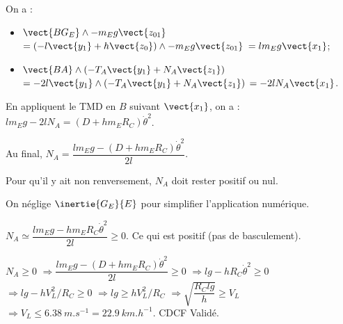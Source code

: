 \ifnormal
{}
\else
\fi
\ifprof
\begin{corrige}
On a : 
\begin{itemize}
\item $\vect{BG_E}\wedge - m_E g \vect{z_{01}}$ 
$=\left(-l\vect{y_1}+h\vect{z_0} \right) \wedge - m_E g \vect{z_{01}}$
$=l  m_E g \vect{x_{1}}$;
\item $\vect{BA}\wedge \left(-T_A\vect{y_1}+N_A\vect{z_1} \right)$ 
$=-2l\vect{y_1}\wedge \left(-T_A\vect{y_1}+N_A\vect{z_1} \right)$
$=-2l N_A\vect{x_1} $.
\end{itemize}
En appliquent le TMD en $B$ suivant $\vect{x_1}$, on a : $l  m_E g -2l N_A=\left(D+ h m_E R_C\right)\dot{\theta}^2$. 

Au final,  $ N_A=\dfrac{ l  m_E g-\left(D+ h m_E R_C\right)\dot{\theta}^2}{2l}$. 
\end{corrige}
\else
\fi

\ifnormal
{}
\else
\fi

\ifprof
\begin{corrige}
Pour qu'il y ait non renversement, $N_A$ doit rester positif ou nul. 
\end{corrige}
\else
\fi

\iftdifficile
{}

\else
\fi


On néglige $\inertie{G_E}{E}$ pour simplifier l’application numérique.

\ifprof
\begin{corrige}
$ N_A\simeq\dfrac{l  m_E g-h m_E R_C\dot{\theta}^2 }{2l} \geq 0$.%
Ce qui est positif (pas de basculement). 

$N_A\geq0$ $\Rightarrow  \dfrac{ l  m_E g-\left(D+ h m_E R_C\right)\dot{\theta}^2}{2l}\geq0$
$\Rightarrow  l  g- h  R_C\dot{\theta}^2\geq0$
$\Rightarrow  l  g- h  V_L^2/R_C\geq0$
$\Rightarrow  l  g \geq h  V_L^2/R_C$
$\Rightarrow   \sqrt{\dfrac{R_C l  g}{h}} \geq   V_L$
$\Rightarrow     V_L  \leq \SI{6,38}{m.s^{-1}}=\SI{22,9}{km.h^{-1}}$. 
CDCF Validé.
\end{corrige}
\else
\fi

